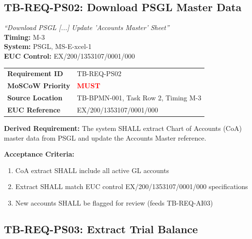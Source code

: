 \documentclass[11pt,a4paper,twoside]{report}
\begin{document}
\subsection{TB-REQ-PS02: Download PSGL Master Data}
\label{req:tb-req-ps02}

\begin{tcolorbox}[colback=sourcegreen!5,colframe=sourcegreen!70,title=BPMN Task Extract]
\textit{``Download PSGL [...] Update 'Accounts Master' Sheet''}\\
\textbf{Timing:} M-3\\
\textbf{System:} PSGL, MS-E-xcel-1\\
\textbf{EUC Control:} EX/200/1353107/0001/000
\end{tcolorbox}

\begin{tabularx}{\textwidth}{@{}lX@{}}
\toprule
\textbf{Requirement ID} & TB-REQ-PS02 \\
\textbf{MoSCoW Priority} & \textcolor{red}{\textbf{MUST}} \\
\textbf{Source Location} & TB-BPMN-001, Task Row 2, Timing M-3 \\
\textbf{EUC Reference} & EX/200/1353107/0001/000 \\
\bottomrule
\end{tabularx}

\textbf{Derived Requirement:} The system SHALL extract Chart of Accounts (CoA)
master data from PSGL and update the Accounts Master reference.

\textbf{Acceptance Criteria:}
\begin{enumerate}[label=AC-PS02-\arabic*:]
\item CoA extract SHALL include all active GL accounts
\item Extract SHALL match EUC control EX/200/1353107/0001/000 specifications
\item New accounts SHALL be flagged for review (feeds TB-REQ-AI03)
\end{enumerate}

\subsection{TB-REQ-PS03: Extract Trial Balance}
\label{req:tb-req-ps03}
\end{document}
